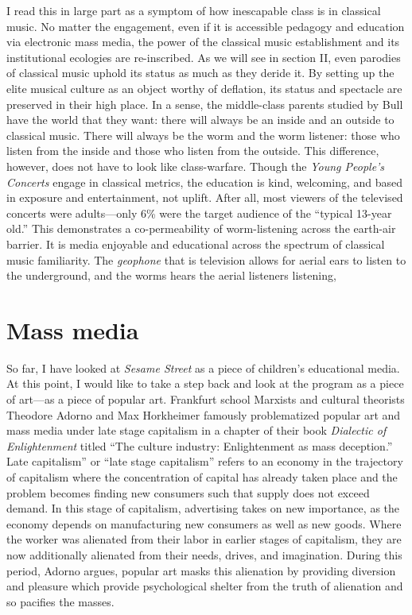 \documentclass[12pt,letterpaper]{article}
\newcommand{\ses}{\textit{Sesame Street }}
\begin{document}
	I read this in large part as a symptom of how inescapable class is in 
	classical music. No matter the engagement, even if it is accessible 
	pedagogy and education via electronic mass media, the power of the 
	classical music
	establishment and its institutional ecologies are re-inscribed. As
	we will see in section II, even parodies of classical music 
	uphold its status as much as they deride it. By 
	setting up the elite musical culture as an object worthy of deflation,
	its status and spectacle are preserved in their high 
	place.\autocite[252]{Garrett} In a sense, the middle-class parents 
	studied by Bull have the world that they want: there will always be
	an inside and an outside to classical music. There will always be the
	worm and the worm listener: those who listen from the inside and those
	who listen from
	the outside. This difference, however, does not have to look like
	class-warfare. Though the \textit{Young People's Concerts} engage in 
	classical metrics, the education is kind, welcoming, and 
	based in exposure and entertainment, not uplift. After all, most viewers
	of the televised concerts were adults---only 6\% were the
	target audience of the ``typical 13-year old.''\autocite[2]{Kopfstein}    
	This demonstrates a co-permeability of worm-listening across the
	earth-air barrier. It is media enjoyable and educational across the
	spectrum of classical music familiarity. The \textit{geophone} that is
	television allows for aerial ears to listen to the underground, and the
	worms hears the aerial listeners listening,    

	\section*{Mass media}

	So far, I have looked at \ses as a piece of 
	children's educational media. At this point, I would like to take 
	a step back and look at the program as a piece of art---as a piece of
	popular art. Frankfurt school Marxists and cultural theorists Theodore 
	Adorno and Max Horkheimer famously problematized popular art and mass 
	media under late stage capitalism in a chapter of their book 
	\textit{Dialectic of Enlightenment} titled ``The culture industry: 
	Enlightenment as mass deception.''\autocite{Adorno} Late capitalism'' 
	or ``late stage capitalism'' 
	refers to an economy in the trajectory of capitalism where the 
	concentration of capital has already taken place and the problem 
	becomes finding new consumers such that supply does not exceed demand. 
	In this stage of capitalism, advertising takes on new importance, as
	the economy depends on manufacturing new consumers as well as new 
	goods.\autocite[66]{Baugh}
	Where the worker was alienated from their labor in earlier stages of 
	capitalism, they are now additionally
	alienated from their needs, drives, and imagination.\autocite[66]{Baugh}
	During this period, Adorno argues, popular art masks this alienation 
	by providing diversion and pleasure which provide psychological shelter
	from the truth of alienation and so pacifies the
	masses.\autocite[67]{Baugh}
\end{document}
